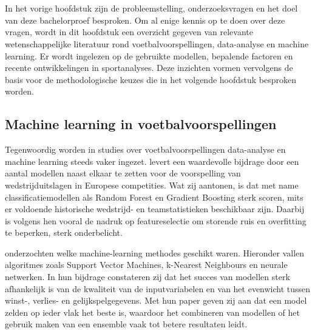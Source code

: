 \chapter{}%
\label{ch:stand-van-zaken}

In het vorige hoofdstuk zijn de probleemstelling, onderzoeksvragen en het doel van deze bachelorproef besproken. 
Om al enige kennis op te doen over deze vragen, wordt in dit hoofdstuk een overzicht gegeven 
van relevante wetenschappelijke literatuur 
rond voetbalvoorspellingen, data-analyse en machine learning. 
Er wordt ingelezen op de gebruikte modellen, bepalende factoren en recente ontwikkelingen in sportanalyses. 
Deze inzichten vormen vervolgens de basis voor de methodologische keuzes die in het volgende hoofdstuk besproken worden.

\vspace{5pt}

\section{Machine learning in voetbalvoorspellingen}

Tegenwoordig worden in studies over voetbalvoorspellingen data-analyse en machine learning steeds vaker ingezet.
\textcite{Rodrigues2022} levert een waardevolle bijdrage door een aantal modellen naast elkaar te zetten voor de voorspelling van wedstrijduitslagen in Europese competities. 
Wat zij aantonen, is dat met name classificatiemodellen als Random Forest en Gradient Boosting sterk scoren, 
mits er voldoende historische wedstrijd- en teamstatistieken beschikbaar zijn. 
Daarbij is volgens hen vooral de nadruk op featureselectie om storende ruis en overfitting te beperken, sterk onderbelicht.

\vspace{5pt}

\textcite{Choi2023} onderzochten welke machine-learning methodes geschikt waren. Hieronder vallen algoritmes zoals Support Vector Machines, k-Nearest Neighbours en neurale netwerken.
In hun bijdrage constateren zij dat het succes van modellen sterk afhankelijk is van de kwaliteit van de inputvariabelen en van het evenwicht tussen winst-, verlies- en gelijkspelgegevens.
Met hun paper geven zij aan dat een model zelden op ieder vlak het beste is, waardoor het combineren van modellen of het gebruik maken van een ensemble vaak tot betere resultaten leidt.

\vspace{5pt}


